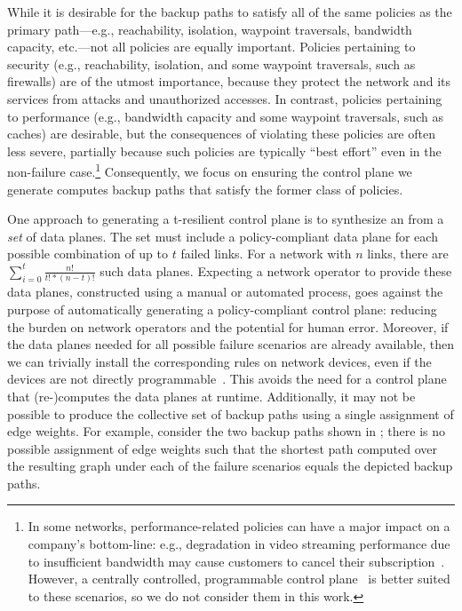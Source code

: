While it is desirable for the backup paths to satisfy all of the same policies
as the primary path---e.g., reachability, isolation, waypoint traversals,
bandwidth capacity, etc.---not all policies are equally important.  Policies
pertaining to security (e.g., reachability, isolation, and some waypoint
traversals, such as firewalls) are of the utmost importance, because they
protect the network and its services from attacks and unauthorized accesses.
In contrast, policies pertaining to performance (e.g., bandwidth capacity and
some waypoint traversals, such as caches) are desirable, but the consequences
of violating these policies are often less severe, partially because such
policies are typically ``best effort'' even in the non-failure
case.\footnote{In some networks, performance-related policies can have a major
impact on a company's bottom-line: e.g., degradation in video streaming
performance due to insufficient bandwidth may cause customers to cancel their
subscription~\cite{TBD}. However, a centrally controlled, programmable control
plane~\cite{swan, b4} is better suited to these scenarios, so we do not
consider them in this work.} Consequently, we focus on ensuring the control
plane we generate computes backup paths that satisfy the former class of
policies. 

One approach to generating a t-resilient control plane is to synthesize an
\ARC from a {\em set} of data planes. The set must include a policy-compliant
data plane for each possible combination of up to $t$ failed links. For a
network with $n$ links, there are $\sum_{i=0}^{t} \frac{n!}{t! * (n-t)!}$ such
data planes. Expecting a network operator to provide these data planes,
constructed using a manual or automated process, goes against the purpose of
automatically generating a policy-compliant control plane: reducing the burden
on network operators and the potential for human error. Moreover, if the data
planes needed for all possible failure scenarios are already available, then
we can trivially install the corresponding rules on network devices, even if
the devices are not directly programmable~\cite{TODO}. This avoids the need
for a control plane that (re-)computes the data planes at runtime.
Additionally, it may not be possible to produce the collective set of backup
paths using a single assignment of edge weights. For example, consider the two
backup paths shown in ; there is no possible assignment of
edge weights such that the shortest path computed over the resulting graph
under each of the failure scenarios equals the depicted backup paths.

